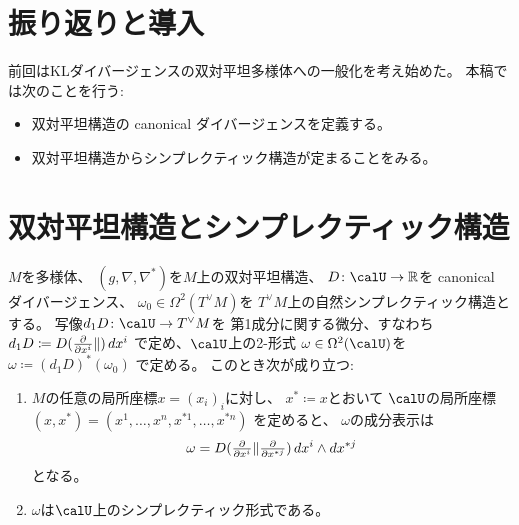\documentclass[report]{jlreq}
\begin{document}
%

%
\section*{振り返りと導入}

前回はKLダイバージェンスの双対平坦多様体への一般化を考え始めた。
本稿では次のことを行う:
\begin{itemize}
    \item 双対平坦構造の canonical ダイバージェンスを定義する。
    \item 双対平坦構造からシンプレクティック構造が定まることをみる。
\end{itemize}

%
\section{双対平坦構造とシンプレクティック構造}

\begin{proposition}[双対平坦構造のシンプレクティック構造]
    $M$を多様体、
    $(g, \nabla, \nabla^*)$を$M$上の双対平坦構造、
    $D \colon \calU \to \R$を canonical ダイバージェンス、
    $\omega_0 \in \Omega^2(T^\vee M)$を
    $T^\vee M$上の自然シンプレクティック構造とする。
    写像$d_1 D \colon \calU \to T^\vee M$を
    第1成分に関する微分、すなわち
    $d_1 D \coloneqq D(\tdeldel{x^i} \|) \, dx^i$
    で定め、$\calU$上の2-形式
    $\omega \in \Omega^2(\calU)$を
    $\omega \coloneqq (d_1 D)^* (\omega_0)$
    で定める。
    このとき次が成り立つ:
    \begin{enumerate}
        \item $M$の任意の局所座標$x = (x_i)_i$に対し、
            $x^* \coloneqq x$とおいて
            $\calU$の局所座標$(x, x^*) = (x^1, \dots, x^n, x^{*1}, \dots, x^{*n})$
            を定めると、
            $\omega$の成分表示は
            \begin{equation}
                \omega
                    =
                        D(\tdeldel{x^i} \| \tdeldel{x^{*j}}) \,
                        dx^i \wedge dx^{*j}
            \end{equation}
            となる。
        \item $\omega$は$\calU$上のシンプレクティック形式である。
    \end{enumerate}
\end{proposition}
\end{document}
